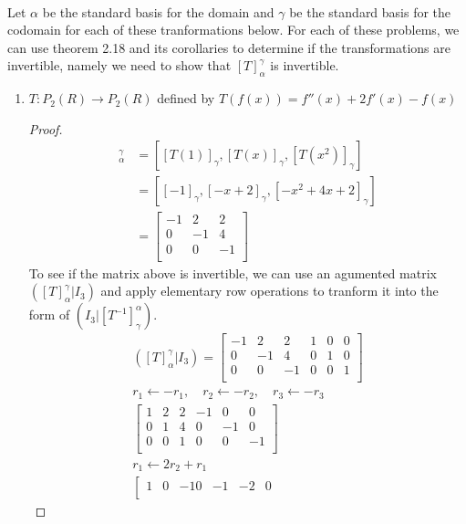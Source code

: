 \documentclass[11pt]{scrartcl}
\begin{document}
\-\\
Let $\alpha$ be the standard basis for the domain and $\gamma$ be the standard basis for the codomain for 
each of these tranformations below. For each of these problems, we can use theorem 2.18 and
its corollaries to determine if the transformations are invertible, namely we need to show 
that $[T]_{\alpha}^{\gamma}$ is invertible.
\begin{enumerate}[label=\alph*.]
	\item{
	$T : P_2(R) \rightarrow P_2(R)$ defined by $T(f(x)) = f''(x) + 2f'(x) - f(x)$
	\begin{proof}
	\begin{align*}
	[T]_{\alpha}^{\gamma} & = [[T(1)]_{\gamma}, [T(x)]_{\gamma}, [T(x^2)]_{\gamma}]\\
	& = [[-1]_{\gamma}, [-x + 2]_{\gamma}, [-x^2 + 4x + 2]_{\gamma}]\\
	& = \begin{bmatrix}
		-1 & 2 & 2\\
		0 & -1 & 4 \\ 
		0 & 0 & -1 \\
	\end{bmatrix}
	\end{align*}
	To see if the matrix above is invertible, we can use an agumented matrix 
	$([T]_{\alpha}^{\gamma}|I_3)$ and apply elementary row operations to tranform it 
	into the form of $(I_3|[T^{-1}]_{\gamma}^{\alpha})$.
	\begin{align*}
	([T]_{\alpha}^{\gamma}|I_3)=
	\left[\begin{array}{ccc|ccc}
	-1 & 2 & 2 & 1 & 0 & 0 \\ 
	0 & -1 & 4 & 0 & 1 & 0 \\ 
	0 & 0 & -1 & 0 & 0 & 1 \\ 
	\end{array}\right]\\
	r_1 \leftarrow -r_1,\quad r_2 \leftarrow -r_2, \quad r_3 \leftarrow -r_3\\
	\left[\begin{array}{ccc|ccc}
	1 & 2 & 2 & -1 & 0 & 0 \\ 
	0 & 1 & 4 & 0 & -1 & 0 \\ 
	0 & 0 & 1 & 0 & 0 & -1 \\ 
	\end{array}\right]\\
	r_1 \leftarrow 2r_2 + r_1\\
	\left[\begin{array}{ccc|ccc}
	1 & 0 & -10 & -1 & -2 & 0 \\ 

\end{array}
\end{align*}
\end{proof}}
\end{enumerate}
\end{document}
